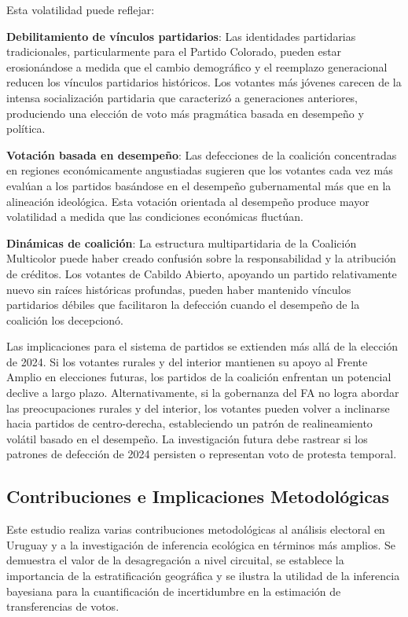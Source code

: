 Esta volatilidad puede reflejar:

\textbf{Debilitamiento de vínculos partidarios}: Las identidades partidarias tradicionales, particularmente para el Partido Colorado, pueden estar erosionándose a medida que el cambio demográfico y el reemplazo generacional reducen los vínculos partidarios históricos. Los votantes más jóvenes carecen de la intensa socialización partidaria que caracterizó a generaciones anteriores, produciendo una elección de voto más pragmática basada en desempeño y política.

\textbf{Votación basada en desempeño}: Las defecciones de la coalición concentradas en regiones económicamente angustiadas sugieren que los votantes cada vez más evalúan a los partidos basándose en el desempeño gubernamental más que en la alineación ideológica. Esta votación orientada al desempeño produce mayor volatilidad a medida que las condiciones económicas fluctúan.

\textbf{Dinámicas de coalición}: La estructura multipartidaria de la Coalición Multicolor puede haber creado confusión sobre la responsabilidad y la atribución de créditos. Los votantes de Cabildo Abierto, apoyando un partido relativamente nuevo sin raíces históricas profundas, pueden haber mantenido vínculos partidarios débiles que facilitaron la defección cuando el desempeño de la coalición los decepcionó.

Las implicaciones para el sistema de partidos se extienden más allá de la elección de 2024. Si los votantes rurales y del interior mantienen su apoyo al Frente Amplio en elecciones futuras, los partidos de la coalición enfrentan un potencial declive a largo plazo. Alternativamente, si la gobernanza del FA no logra abordar las preocupaciones rurales y del interior, los votantes pueden volver a inclinarse hacia partidos de centro-derecha, estableciendo un patrón de realineamiento volátil basado en el desempeño. La investigación futura debe rastrear si los patrones de defección de 2024 persisten o representan voto de protesta temporal.

\subsection{Contribuciones e Implicaciones Metodológicas}
\label{sec:discusion_metodologia}

Este estudio realiza varias contribuciones metodológicas al análisis electoral en Uruguay y a la investigación de inferencia ecológica en términos más amplios. Se demuestra el valor de la desagregación a nivel circuital, se establece la importancia de la estratificación geográfica y se ilustra la utilidad de la inferencia bayesiana para la cuantificación de incertidumbre en la estimación de transferencias de votos.

